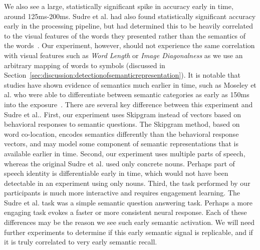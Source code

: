 We also see a large, statistically significant spike in \tvt accuracy early in time, around 125ms-200ms. Sudre et al. had also found statistically significant accuracy early in the processing pipeline, but had determined this to be heavily correlated to the visual features of the words they presented rather than the semantics of the words~\cite{Sudre2012}. Our experiment, however, should not experience the same correlation with visual features such as \emph{Word Length} or \emph{Image Diagonalness} as we use an arbitrary mapping of words to symbols (discussed in Section~\ref{sec:discussion:detectionofsemanticrepresentation}). It is notable that studies have shown evidence of semantics much earlier in time, such as Moseley et al. who were able to differentiate between semantic categories as early as 150ms into the exposure~\cite{moseley2013sensorimotor}. There are several key difference between this experiment and Sudre et al..  First, our experiment uses Skipgram instead of vectors based on behavioral responses to semantic questions. The Skipgram method, based on word co-location, encodes semantics differently than the behavioral response vectors, and may model some component of semantic representations that is available earlier in time.  Second, our experiment uses multiple parts of speech, whereas the original Sudre et al. used only concrete nouns.  Perhaps part of speech identity is differentiable early in time, which would not have been detectable in an experiment using only nouns.  Third, the task performed by our participants is much more interactive and requires engagement learning.  The Sudre et al. task was a simple semantic question answering task. Perhaps a more engaging task evokes a faster or more consistent neural response.  Each of these differences may be the reason we see such early semantic activation.  We will need further experiments to determine if this early semantic signal is replicable, and if it is truly correlated to very early semantic recall.
